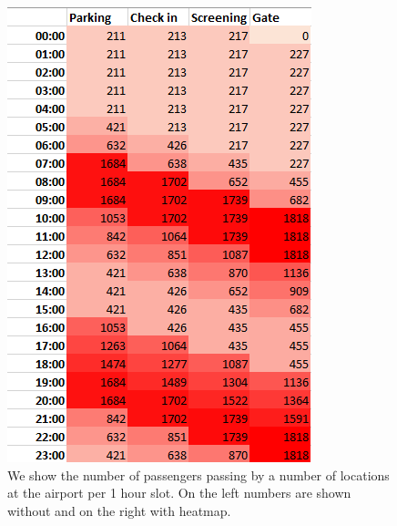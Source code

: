 \documentclass[10pt]{extarticle}
\newcommand{\<}{\langle}
\renewcommand{\>}{\rangle}
\theoremstyle{mystyle}{\newtheorem*{remark}{Remark}}
\theoremstyle{mystyle}{\newtheorem*{remarks}{Remarks}}
\theoremstyle{mystyle}{\newtheorem*{example}{Example}}
\theoremstyle{mystyle}{\newtheorem*{examples}{Examples}}
\theoremstyle{definition}{\newtheorem*{exercise}{Exercise}}
\theoremstyle{warn}
\begin{document}
\begin{figure}[htbp]
\begin{minipage}[b]{0.3\textwidth}
    \includegraphics[width=\textwidth]{figures/visualizations/01heatmap.png}
  \end{minipage}
  \caption{We show the number of passengers passing by a number of locations at the airport per 1 hour slot. On the left numbers are shown without and on the right with heatmap.}
  \label{fig:heatmap_example}
\end{figure}
\end{document}
